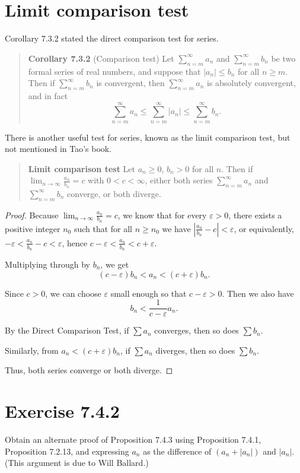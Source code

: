 \documentclass{article}
\begin{document}
\section{Limit comparison test}
Corollary 7.3.2 stated the direct comparison test for series.
\begin{quotation}
    \textbf{Corollary 7.3.2} (Comparison test) Let $\sum_{n=m}^{\infty} a_n$ and
    $\sum_{n=m}^{\infty} b_n$ be two formal series of real numbers, and suppose
    that $|a_n| \leq b_n$ for all $n \geq m$.
    Then if $\sum_{n=m}^{\infty} b_n$ is convergent, then $\sum_{n=m}^{\infty} a_n$
    is absolutely convergent, and in fact
    \[
        \sum_{n=m}^{\infty} a_n \leq \sum_{n=m}^{\infty} |a_n| \leq \sum_{n=m}^{\infty} b_n.
    \]
\end{quotation}
There is another useful test for series, known as the limit comparison test, but not mentioned in Tao's book.
\begin{quotation}
    \textbf{Limit comparison test}
    Let $a_n \geq 0$, $b_n > 0$ for all $n$. Then if
    $\lim_{n \to \infty} \frac{a_n}{b_n} = c$ with $0 < c < \infty$,
    either both series $\sum_{n=m}^{\infty} a_n$ and
    $\sum_{n=m}^{\infty} b_n$ converge, or both diverge.
\end{quotation}
\begin{proof}
    Because $\lim_{n \to \infty} \frac{a_n}{b_n} = c$, we know that for every
    $\varepsilon > 0$, there exists a positive integer $n_0$ such that for all
    $n \geq n_0$ we have
    $\left| \frac{a_n}{b_n} - c \right| < \varepsilon$, or equivalently,
    $-\varepsilon < \frac{a_n}{b_n} - c < \varepsilon$, hence
    $c - \varepsilon < \frac{a_n}{b_n} < c + \varepsilon$.

    Multiplying through by $b_n$, we get
    \[
        (c - \varepsilon)b_n < a_n < (c + \varepsilon)b_n.
    \]

    Since $c > 0$, we can choose $\varepsilon$ small enough so that
    $c - \varepsilon > 0$. Then we also have
    \[
        b_n < \frac{1}{c - \varepsilon} a_n.
    \]

    By the Direct Comparison Test, if $\sum a_n$ converges, then so does
    $\sum b_n$.

    Similarly, from $a_n < (c + \varepsilon)b_n$, if $\sum a_n$ diverges,
    then so does $\sum b_n$.

    Thus, both series converge or both diverge.
\end{proof}

\section{Exercise 7.4.2}
Obtain an alternate proof of Proposition 7.4.3 using Proposition 7.4.1,
Proposition 7.2.13, and expressing $a_n$ as the difference of $(a_n + |a_n|)$
and $|a_n|$. (This argument is due to Will Ballard.)
\end{document}
